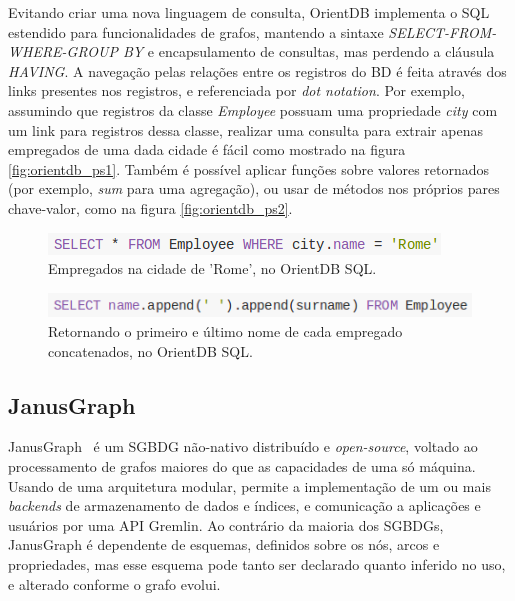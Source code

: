 \documentclass[conference]{IEEEtran}
\begin{document}
Evitando criar uma nova linguagem de consulta, OrientDB implementa o SQL estendido para funcionalidades de grafos, mantendo a sintaxe \emph{SELECT-FROM-WHERE-GROUP BY} e encapsulamento de consultas, mas perdendo a cláusula \emph{HAVING}. A navegação pelas relações entre os registros do BD é feita através dos links presentes nos registros, e referenciada por \emph{dot notation}. Por exemplo, assumindo que registros da classe \emph{Employee} possuam uma propriedade \emph{city} com um link para registros dessa classe, realizar uma consulta para extrair apenas empregados de uma dada cidade é fácil como mostrado na figura \ref{fig:orientdb_ps1}. Também é possível aplicar funções sobre valores retornados (por exemplo, \emph{sum} para uma agregação), ou usar de métodos nos próprios pares chave-valor, como na figura \ref{fig:orientdb_ps2}.

\begin{figure}[htbp]
\centerline{\includegraphics[width=0.9\linewidth]{img/orientdb/orientdb_ps1.png}}
\caption{Empregados na cidade de 'Rome', no OrientDB SQL.}\label{fig:orientdb_ps1}
\label{fig}
\end{figure}

\begin{figure}[htbp]
\centerline{\includegraphics[width=0.9\linewidth]{img/orientdb/orientdb_ps2.png}}
\caption{Retornando o primeiro e último nome de cada empregado concatenados, no OrientDB SQL.}\label{fig:orientdb_ps2}
\label{fig}
\end{figure}

\subsection{JanusGraph}

JanusGraph~\cite{janusgraph} é um SGBDG não-nativo distribuído e \emph{open-source}, voltado ao processamento de grafos maiores do que as capacidades de uma só máquina. Usando de uma arquitetura modular, permite a implementação de um ou mais \emph{backends} de armazenamento de dados e índices, e comunicação a aplicações e usuários por uma API Gremlin. Ao contrário da maioria dos SGBDGs, JanusGraph é dependente de esquemas, definidos sobre os nós, arcos e propriedades, mas esse esquema pode tanto ser declarado quanto inferido no uso, e alterado conforme o grafo evolui.
\end{document}
